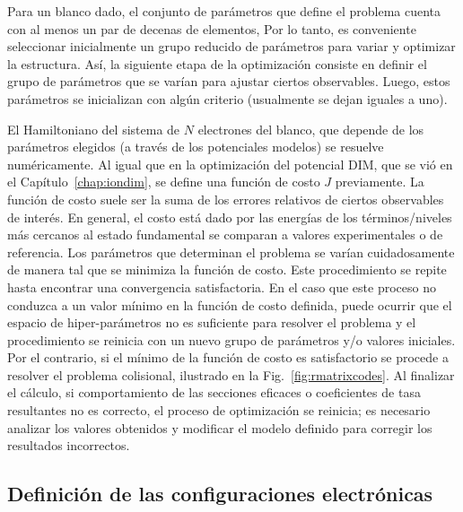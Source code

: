 Para un blanco dado, el conjunto de parámetros que define el problema
cuenta con al menos un par de decenas de elementos,  Por lo tanto, es 
conveniente seleccionar inicialmente un grupo reducido de parámetros 
para variar y optimizar la estructura. Así, la siguiente etapa de la
optimización consiste en definir el grupo de parámetros que se varían
para ajustar ciertos observables. Luego, estos parámetros se inicializan 
con algún criterio (usualmente se dejan iguales a uno). 

El Hamiltoniano del sistema de $N$ electrones del blanco, que depende de 
los parámetros elegidos (a través de los potenciales modelos) se 
resuelve numéricamente. Al igual que en la optimización del potencial 
DIM, que se vió en el Capítulo~\ref{chap:iondim}, se define una función 
de costo $J$ previamente. La función de costo suele ser la suma de los 
errores relativos de ciertos observables de interés. En general, el 
costo está dado por las energías de los términos/niveles más cercanos al 
estado fundamental se comparan a valores experimentales o de referencia.
Los parámetros que determinan el problema se varían cuidadosamente de 
manera tal que se minimiza la función de costo. Este procedimiento se 
repite hasta encontrar una convergencia satisfactoria. En el caso que 
este proceso no conduzca a un valor mínimo en la función de costo 
definida, puede ocurrir que el espacio de hiper-parámetros no es 
suficiente para resolver el problema y el procedimiento se reinicia con 
un nuevo grupo de parámetros y/o valores iniciales. 
Por el contrario, si el mínimo de la función de costo es satisfactorio 
se procede a resolver el problema colisional, ilustrado en la 
Fig.~\ref{fig:rmatrixcodes}. Al finalizar el cálculo, si comportamiento 
de las secciones eficaces o coeficientes de tasa resultantes no es 
correcto, el proceso de optimización se reinicia; es necesario analizar 
los valores obtenidos y modificar el modelo definido para corregir los 
resultados incorrectos. 

\subsection{Definición de las configuraciones electrónicas}

